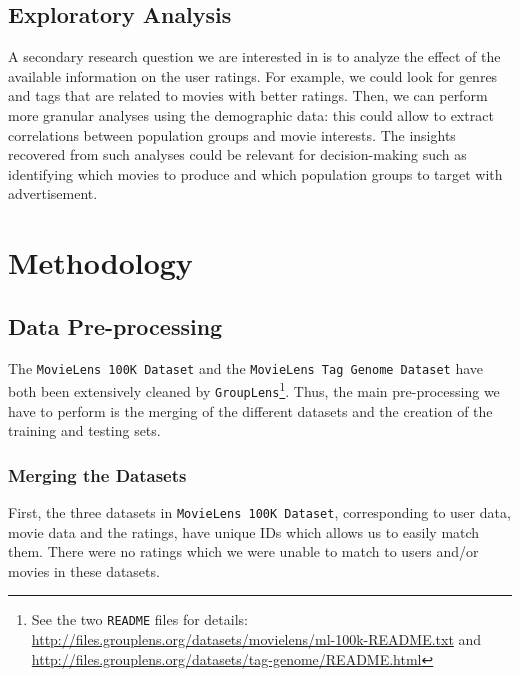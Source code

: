 \documentclass[bj, preprint]{imsart}
\begin{document}
\subsection{Exploratory Analysis}

A secondary research question we are interested in is to analyze the effect of the available information on the user ratings. 
For example, we could look for genres and tags that are related to movies with better ratings. 
Then, we can perform more granular analyses using the demographic data: this could allow to extract correlations between population groups and movie interests. 
The insights recovered from such analyses could be relevant for decision-making such as identifying which movies to produce and which population groups to target with advertisement.

\section{Methodology}\label{sec:method}

\subsection{Data Pre-processing}\label{subsec:method.preprocess}

The \texttt{MovieLens 100K Dataset} and the \texttt{MovieLens Tag Genome Dataset} have both been extensively cleaned by \texttt{GroupLens}\footnote{See the two \texttt{README} files for details: \url{http://files.grouplens.org/datasets/movielens/ml-100k-README.txt} and \url{http://files.grouplens.org/datasets/tag-genome/README.html}}. 
Thus, the main pre-processing we have to perform is the merging of the different datasets and the creation of the training and testing sets.

\subsubsection{Merging the Datasets}\label{subsubsec:method.preprocess.merge}

First, the three datasets in \texttt{MovieLens 100K Dataset}, corresponding to user data, movie data and the ratings, have unique IDs which allows us to easily match them. 
There were no ratings which we were unable to match to users and/or movies in these datasets.
\end{document}

